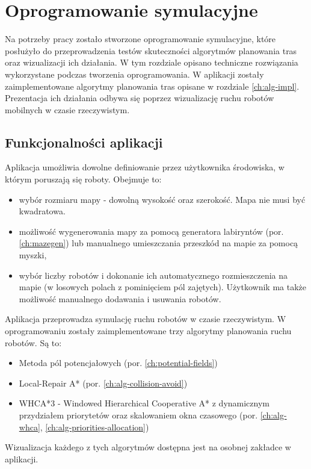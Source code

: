 \chapter{Oprogramowanie symulacyjne}
\label{ch:simulation-app}

Na potrzeby pracy zostało stworzone oprogramowanie symulacyjne, które posłużyło do przeprowadzenia testów skuteczności algorytmów planowania tras oraz wizualizacji ich działania.
W tym rozdziale opisano techniczne rozwiązania wykorzystane podczas tworzenia oprogramowania.
W aplikacji zostały zaimplementowane algorytmy planowania tras opisane w rozdziale \ref{ch:alg-impl}.
Prezentacja ich działania odbywa się poprzez wizualizację ruchu robotów mobilnych w czasie rzeczywistym. 

\section{Funkcjonalności aplikacji}
Aplikacja umożliwia dowolne definiowanie przez użytkownika środowiska, w którym poruszają się roboty. Obejmuje to:
\begin{itemize}
	\item wybór rozmiaru mapy - dowolną wysokość oraz szerokość. Mapa nie musi być kwadratowa.
	\item możliwość wygenerowania mapy za pomocą generatora labiryntów (por. \ref{ch:mazegen}) lub manualnego umieszczania przeszkód na mapie za pomocą myszki,
	\item wybór liczby robotów i dokonanie ich automatycznego rozmieszczenia na mapie (w losowych polach z pominięciem pól zajętych). Użytkownik ma także możliwość manualnego dodawania i usuwania robotów.
\end{itemize}

Aplikacja przeprowadza symulację ruchu robotów w czasie rzeczywistym. W oprogramowaniu zostały zaimplementowane trzy algorytmy planowania ruchu robotów. Są to:
\begin{itemize}
	\item Metoda pól potencjałowych (por. \ref{ch:potential-fields})
	\item Local-Repair A* (por. \ref{ch:alg-collision-avoid})
	\item WHCA*3 - Windowed Hierarchical Cooperative A* z dynamicznym przydziałem priorytetów oraz skalowaniem okna czasowego (por. \ref{ch:alg-whca}, \ref{ch:alg-priorities-allocation})
\end{itemize}
Wizualizacja każdego z tych algorytmów dostępna jest na osobnej zakładce w aplikacji.
